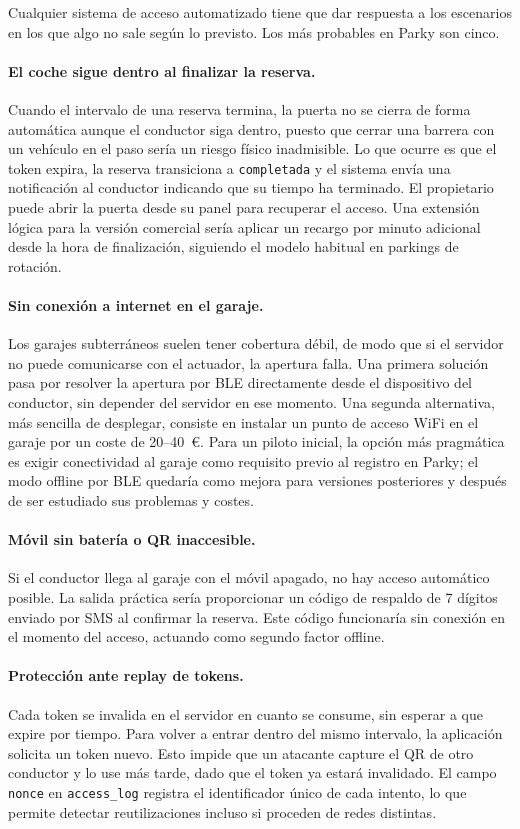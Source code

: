 Cualquier sistema de acceso automatizado tiene que dar respuesta a los escenarios en los que algo no sale según lo previsto. Los más probables en Parky son cinco.

\paragraph{El coche sigue dentro al finalizar la reserva.} Cuando el intervalo de una reserva termina, la puerta no se cierra de forma automática aunque el conductor siga dentro, puesto que cerrar una barrera con un vehículo en el paso sería un riesgo físico inadmisible. Lo que ocurre es que el token expira, la reserva transiciona a \texttt{completada} y el sistema envía una notificación al conductor indicando que su tiempo ha terminado. El propietario puede abrir la puerta desde su panel para recuperar el acceso. Una extensión lógica para la versión comercial sería aplicar un recargo por minuto adicional desde la hora de finalización, siguiendo el modelo habitual en parkings de rotación.

\paragraph{Sin conexión a internet en el garaje.} Los garajes subterráneos suelen tener cobertura débil, de modo que si el servidor no puede comunicarse con el actuador, la apertura falla. Una primera solución pasa por resolver la apertura por BLE directamente desde el dispositivo del conductor, sin depender del servidor en ese momento. Una segunda alternativa, más sencilla de desplegar, consiste en instalar un punto de acceso WiFi en el garaje por un coste de 20--40~€. Para un piloto inicial, la opción más pragmática es exigir conectividad al garaje como requisito previo al registro en Parky; el modo offline por BLE quedaría como mejora para versiones posteriores y después de ser estudiado sus problemas y costes.

\paragraph{Móvil sin batería o QR inaccesible.} Si el conductor llega al garaje con el móvil apagado, no hay acceso automático posible. La salida práctica sería proporcionar un código de respaldo de 7 dígitos enviado por SMS al confirmar la reserva. Este código funcionaría sin conexión en el momento del acceso, actuando como segundo factor offline.

\paragraph{Protección ante replay de tokens.} Cada token se invalida en el servidor en cuanto se consume, sin esperar a que expire por tiempo. Para volver a entrar dentro del mismo intervalo, la aplicación solicita un token nuevo. Esto impide que un atacante capture el QR de otro conductor y lo use más tarde, dado que el token ya estará invalidado. El campo \texttt{nonce} en \texttt{access\_log} registra el identificador único de cada intento, lo que permite detectar reutilizaciones incluso si proceden de redes distintas.


